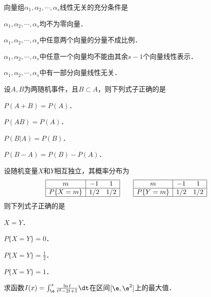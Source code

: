 \documentclass[plain,noanswer,medmath]{../../template/jnuexam}
\begin{document}
\begin{problem}
向量组$\alpha_1,\alpha_2,\cdots,\alpha_s$线性无关的充分条件是\pickout{}
\begin{abcd}
\item $\alpha_1,\alpha_2,\cdots,\alpha_s$均不为零向量．
\item $\alpha_1,\alpha_2,\cdots,\alpha_s$中任意两个向量的分量不成比例．
\item $\alpha_1,\alpha_2,\cdots,\alpha_s$中任意一个向量均不能由其余$s-1$个向量线性表示．
\item $\alpha_1,\alpha_2,\cdots,\alpha_s$中有一部分向量线性无关．
\end{abcd}
\end{problem}


\begin{problem}
设$A,B$为两随机事件，且$B\subset A$，则下列式子正确的是\pickout{}
\begin{abcd}
\item $P(A+B)=P(A)$．
\item $P(AB)=P(A)$．
\item $P(B|A)=P(B)$．
\item $P(B-A)=P(B)-P(A)$．
\end{abcd}
\end{problem}


\begin{problem}
设随机变量$X$和$Y$相互独立，其概率分布为
$$\begin{array}{|c|cc|}
\hline
         m &  -1 & 1 \\
\hline
  P\{X=m\} & 1/2 & 1/2\\
\hline
\end{array}
\qquad
\begin{array}{|c|cc|}
\hline
         m &  -1 & 1 \\
\hline
  P\{Y=m\} & 1/2 & 1/2 \\
\hline
\end{array}$$
则下列式子正确的是\pickout{}
\begin{abcd}
\item $X=Y$．
\item $P\{X=Y\}=0$．
\item $P\{X=Y\}=\frac{1}{2}$．
\item $P\{X=Y\}=1$．
\end{abcd}
\end{problem}




\begin{problem}
求函数$I(x)=\int_{\e}^x \frac{\ln t}{t^2-2t+1}\dt$在区间$[\e, \e^2]$上的最大值．
\end{problem}
\end{document}
